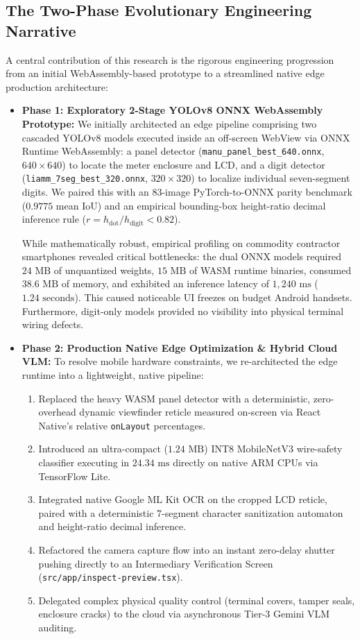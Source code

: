 \documentclass[12pt,a4paper,oneside]{report}
\begin{document}
\subsection{The Two-Phase Evolutionary Engineering Narrative}
A central contribution of this research is the rigorous engineering progression from an initial WebAssembly-based prototype to a streamlined native edge production architecture:
\begin{itemize}
    \item \textbf{Phase 1: Exploratory 2-Stage YOLOv8 ONNX WebAssembly Prototype:} We initially architected an edge pipeline comprising two cascaded YOLOv8 models executed inside an off-screen WebView via ONNX Runtime WebAssembly: a panel detector (\texttt{manu\_panel\_best\_640.onnx}, $640\times 640$) to locate the meter enclosure and LCD, and a digit detector (\texttt{liamm\_7seg\_best\_320.onnx}, $320\times 320$) to localize individual seven-segment digits. We paired this with an 83-image PyTorch-to-ONNX parity benchmark ($0.9775$ mean IoU) and an empirical bounding-box height-ratio decimal inference rule ($r = h_{\text{dot}} / h_{\text{digit}} < 0.82$).
    
    While mathematically robust, empirical profiling on commodity contractor smartphones revealed critical bottlenecks: the dual ONNX models required $24\text{~MB}$ of unquantized weights, $15\text{~MB}$ of WASM runtime binaries, consumed $38.6\text{~MB}$ of memory, and exhibited an inference latency of $1,240\text{~ms}$ ($1.24\text{~seconds}$). This caused noticeable UI freezes on budget Android handsets. Furthermore, digit-only models provided no visibility into physical terminal wiring defects.
    
    \item \textbf{Phase 2: Production Native Edge Optimization \& Hybrid Cloud VLM:} To resolve mobile hardware constraints, we re-architected the edge runtime into a lightweight, native pipeline:
    \begin{enumerate}
        \item Replaced the heavy WASM panel detector with a deterministic, zero-overhead dynamic viewfinder reticle measured on-screen via React Native's relative \texttt{onLayout} percentages.
        \item Introduced an ultra-compact ($1.24\text{~MB}$) INT8 MobileNetV3 wire-safety classifier executing in $24.34\text{~ms}$ directly on native ARM CPUs via TensorFlow Lite.
        \item Integrated native Google ML Kit OCR on the cropped LCD reticle, paired with a deterministic 7-segment character sanitization automaton and height-ratio decimal inference.
        \item Refactored the camera capture flow into an instant zero-delay shutter pushing directly to an Intermediary Verification Screen (\texttt{src/app/inspect-preview.tsx}).
        \item Delegated complex physical quality control (terminal covers, tamper seals, enclosure cracks) to the cloud via asynchronous Tier-3 Gemini VLM auditing.
    \end{enumerate}
\end{itemize}
\end{document}
